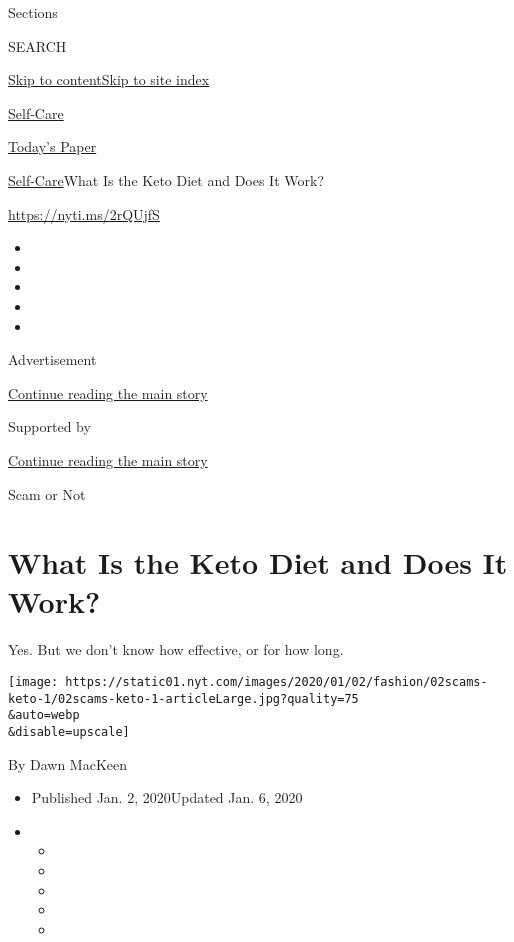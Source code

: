 Sections

SEARCH

\protect\hyperlink{site-content}{Skip to
content}\protect\hyperlink{site-index}{Skip to site index}

\href{https://www.nytimes.com/section/style/self-care/}{Self-Care}

\href{https://myaccount.nytimes.com/auth/login?response_type=cookie\&client_id=vi}{}

\href{https://www.nytimes.com/section/todayspaper}{Today's Paper}

\href{/section/style/self-care/}{Self-Care}\textbar{}What Is the Keto
Diet and Does It Work?

\url{https://nyti.ms/2rQUjfS}

\begin{itemize}
\item
\item
\item
\item
\item
\end{itemize}

Advertisement

\protect\hyperlink{after-top}{Continue reading the main story}

Supported by

\protect\hyperlink{after-sponsor}{Continue reading the main story}

Scam or Not

\hypertarget{what-is-the-keto-diet-and-does-it-work}{%
\section{What Is the Keto Diet and Does It
Work?}\label{what-is-the-keto-diet-and-does-it-work}}

Yes. But we don't know how effective, or for how long.

\texttt{[image: https://static01.nyt.com/images/2020/01/02/fashion/02scams-keto-1/02scams-keto-1-articleLarge.jpg?quality=75\\\&auto=webp\\\&disable=upscale]}

By Dawn MacKeen

\begin{itemize}
\item
  Published Jan. 2, 2020Updated Jan. 6, 2020
\item
  \begin{itemize}
  \item
  \item
  \item
  \item
  \item
  \end{itemize}
\end{itemize}

